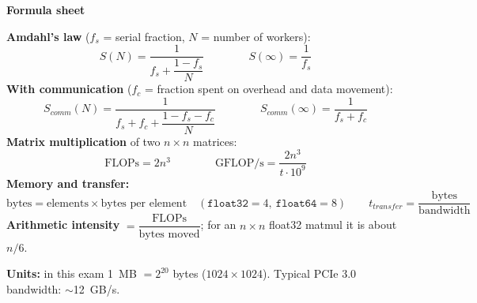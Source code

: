\documentclass[addpoints,11pt]{exam}
\begin{document}
\clearpage
\begin{center}{\Large\bfseries Formula sheet}\end{center}

\bigskip
\noindent\textbf{Amdahl's law} ($f_s$ = serial fraction, $N$ = number of workers):
\[
  S(N)=\frac{1}{f_s+\dfrac{1-f_s}{N}} \qquad\qquad
  S(\infty)=\frac{1}{f_s}
\]
\textbf{With communication} ($f_c$ = fraction spent on overhead and data movement):
\[
  S_{comm}(N)=\frac{1}{f_s+f_c+\dfrac{1-f_s-f_c}{N}} \qquad\qquad
  S_{comm}(\infty)=\frac{1}{f_s+f_c}
\]
\textbf{Matrix multiplication} of two $n\times n$ matrices:
\[
  \text{FLOPs}=2n^3 \qquad\qquad
  \text{GFLOP/s}=\frac{2n^3}{t\cdot10^{9}}
\]
\textbf{Memory and transfer:}
\[
  \text{bytes}=\text{elements}\times\text{bytes per element}
  \quad(\texttt{float32}=4,\ \texttt{float64}=8)
  \qquad
  t_{transfer}=\frac{\text{bytes}}{\text{bandwidth}}
\]
\textbf{Arithmetic intensity} $=\dfrac{\text{FLOPs}}{\text{bytes moved}}$; for an $n\times n$ float32 matmul it is about $n/6$.

\bigskip
\noindent\textbf{Units:} in this exam 1~MB $=2^{20}$ bytes ($1024\times1024$). Typical PCIe 3.0 bandwidth: $\sim$12~GB/s.
\end{document}
